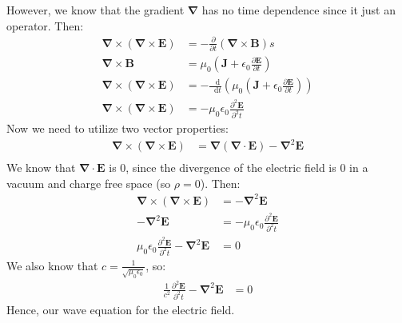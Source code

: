 \documentclass{article}
\newcommand*\VF[1]{\mathbf{#1}}
\newcommand*\dif{\mathop{}\!\mathrm{d}}
\begin{document}
However, we know that the gradient $\VF{\nabla}$ has no time dependence since it just an operator. Then:
\begin{align*}
\VF{\nabla} \times (\VF{\nabla} \times \VF{E}) &= -\frac{\partial}{\partial t}\left(\VF{\nabla} \times \VF{B}\right)s\\
\VF{\nabla} \times \VF{B} &= \mu_0\left(\VF{J} + \epsilon_0\frac{\partial \VF{E}}{\partial t}\right)\\
\VF{\nabla} \times (\VF{\nabla} \times \VF{E}) &= -\frac{\dif}{\dif t}\left(\mu_0\left(\VF{J} + \epsilon_0\frac{\partial \VF{E}}{\partial t}\right)\right)\\
\VF{\nabla} \times (\VF{\nabla} \times \VF{E}) &= -\mu_0\epsilon_0\frac{\partial^2\VF{E}}{\partial^2 t}
\end{align*}
Now we need to utilize two vector properties:
\begin{align*}
\VF{\nabla} \times (\VF{\nabla} \times \VF{E}) &= \VF{\nabla}(\VF{\nabla}\cdot\VF{E}) - \VF{\nabla}^2\VF{E}\\
\end{align*}
We know that $\VF{\nabla}\cdot\VF{E}$ is $0$, since the divergence of the electric field is $0$ in a vacuum and charge free space (so $\rho = 0$). Then:
\begin{align*}
\VF{\nabla} \times (\VF{\nabla} \times \VF{E}) &= - \VF{\nabla}^2\VF{E}\\
- \VF{\nabla}^2\VF{E} &= -\mu_0\epsilon_0\frac{\partial^2\VF{E}}{\partial^2 t}\\
\mu_0\epsilon_0\frac{\partial^2\VF{E}}{\partial^2 t} - \VF{\nabla}^2\VF{E} &= 0
\end{align*}
We also know that $c = \frac{1}{\sqrt{\mu_0\epsilon_0}}$, so:
\begin{align*}
\frac{1}{c^2}\frac{\partial^2\VF{E}}{\partial^2 t} - \VF{\nabla}^2\VF{E} &= 0
\end{align*}
Hence, our wave equation for the electric field.
\end{document}

